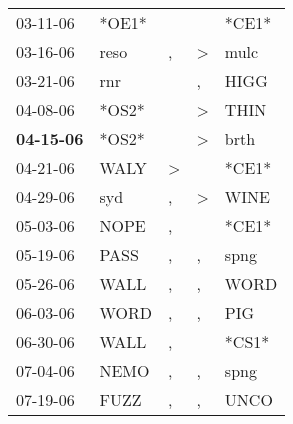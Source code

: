 \begin{supertabular}{p{0.07\textwidth}p{0.06\textwidth}p{0.02\textwidth}p{0.02\textwidth}p{0.06\textwidth}}
          03-11-06\textsuperscript{} &                            *OE1* &                  &                  &                            *CE1* \\
          03-16-06\textsuperscript{} &           reso\textsuperscript{} &                , &     \textgreater &           mulc\textsuperscript{} \\
          03-21-06\textsuperscript{} &            rnr\textsuperscript{} &                  &                , &           HIGG\textsuperscript{} \\
          04-08-06\textsuperscript{} &                            *OS2* &                  &     \textgreater &           THIN\textsuperscript{} \\
 \textbf{04-15-06\textsuperscript{}} &                            *OS2* &                  &     \textgreater &           brth\textsuperscript{} \\
          04-21-06\textsuperscript{} &           WALY\textsuperscript{} &     \textgreater &                  &                            *CE1* \\
          04-29-06\textsuperscript{} &            syd\textsuperscript{} &                , &     \textgreater &           WINE\textsuperscript{} \\
          05-03-06\textsuperscript{} &           NOPE\textsuperscript{} &                , &                  &                            *CE1* \\
          05-19-06\textsuperscript{} &           PASS\textsuperscript{} &                , &                , &           spng\textsuperscript{} \\
          05-26-06\textsuperscript{} &           WALL\textsuperscript{} &                , &                , &           WORD\textsuperscript{} \\
          06-03-06\textsuperscript{} &           WORD\textsuperscript{} &                , &                , &            PIG\textsuperscript{} \\
          06-30-06\textsuperscript{} &           WALL\textsuperscript{} &                , &                  &                            *CS1* \\
          07-04-06\textsuperscript{} &           NEMO\textsuperscript{} &                , &                , &           spng\textsuperscript{} \\
          07-19-06\textsuperscript{} &           FUZZ\textsuperscript{} &                , &                , &           UNCO\textsuperscript{} \\

\end{supertabular}
